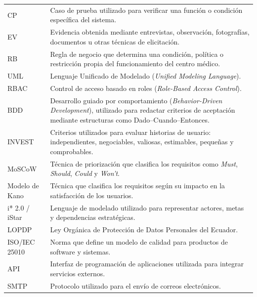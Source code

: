 \documentclass[11pt,a4paper]{article}
\begin{document}
\begin{longtable}{p{} p{}}
		CP &
		Caso de prueba utilizado para verificar una función o condición específica del sistema. \\
		
		EV &
		Evidencia obtenida mediante entrevistas, observación, fotografías, documentos u otras técnicas de elicitación. \\
		
		RB &
		Regla de negocio que determina una condición, política o restricción propia del funcionamiento del centro médico. \\
		
		UML &
		Lenguaje Unificado de Modelado (\textit{Unified Modeling Language}). \\
		
		RBAC &
		Control de acceso basado en roles (\textit{Role-Based Access Control}). \\
		
		BDD &
		Desarrollo guiado por comportamiento (\textit{Behavior-Driven Development}), utilizado para redactar criterios de aceptación mediante estructuras como Dado--Cuando--Entonces. \\
		
		INVEST &
		Criterios utilizados para evaluar historias de usuario: independientes, negociables, valiosas, estimables, pequeñas y comprobables. \\
		
		MoSCoW &
		Técnica de priorización que clasifica los requisitos como \textit{Must}, \textit{Should}, \textit{Could} y \textit{Won't}. \\
		
		Modelo de Kano &
		Técnica que clasifica los requisitos según su impacto en la satisfacción de los usuarios. \\
		
		i* 2.0 / iStar &
		Lenguaje de modelado utilizado para representar actores, metas y dependencias estratégicas. \\
		
		LOPDP &
		Ley Orgánica de Protección de Datos Personales del Ecuador. \\
		
		ISO/IEC 25010 &
		Norma que define un modelo de calidad para productos de software y sistemas. \\
		
		API &
		Interfaz de programación de aplicaciones utilizada para integrar servicios externos. \\
		
		SMTP &
		Protocolo utilizado para el envío de correos electrónicos. \\
		

\end{longtable}
\end{document}
